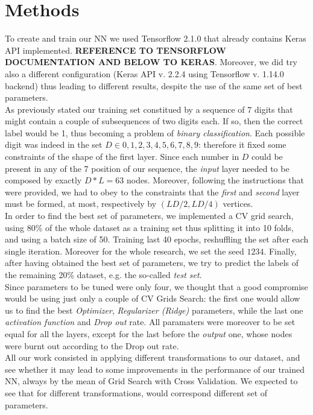 \documentclass[prl,twocolumn]{revtex4-1}
\begin{document}
\section{Methods}
To create and train our NN we used Tensorflow 2.1.0 that already contains Keras API implemented. \textbf{REFERENCE TO TENSORFLOW DOCUMENTATION AND BELOW TO KERAS}. Moreover, we did try also a different configuration (Keras API v. 2.2.4 using Tensorflow v. 1.14.0 backend) thus leading to different results, despite the use of the same set of best parameters.\\
As previously stated our training set constitued by a sequence of 7 digits that might contain a couple of subsequences of two digits each. If so, then the correct label would be 1, thus becoming a problem of \textit{binary classification}. Each possible digit was indeed in the set $D \in  {0,1,2,3,4,5,6,7,8,9}$: therefore it fixed some constraints of the shape of the first layer. Since each number in $D$ could be present in any of the 7 position of our sequence, the \textit{input} layer needed to be composed by exactly $D*L=63$ nodes. Moreover, following the instructions that were provided, we had to obey to the constraints that the \textit{first} and \textit{second} layer must be formed, at most,  respectively by $(LD/2, LD/4)$ vertices.\\
In order to find the best set of parameters, we implemented a CV grid search, using 80\% of the whole dataset as a training set thus splitting it into 10 folds, and using a batch size of 50. Training last 40 epochs, reshuffling the set after each single iteration. Moreover for the whole research, we set the seed $1234$. Finally, after having obtained the best set of parameters, we try to predict the labels of the remaining 20\% dataset, e.g. the so-called \textit{test set}.\\
Since parameters to be tuned were only four, we thought that a good compromise would be using just only a couple of CV Grids Search: the first one would allow us to find the best \textit{Optimizer}, \textit{Regularizer (Ridge)} parameters, while the last one \textit{activation function} and \textit{Drop out} rate. All paramaters were moreover to be set equal for all the layers, except for the last before the \textit{output} one, whose nodes were burnt out according to the Drop out rate.\\
All our work consisted in applying different transformations to our dataset, and see whether it may lead to some improvements in the performance of our trained NN, always by the mean of Grid Search with Cross Validation. We expected to see that for different transformations, would correspond different set of parameters.\\
\end{document}
